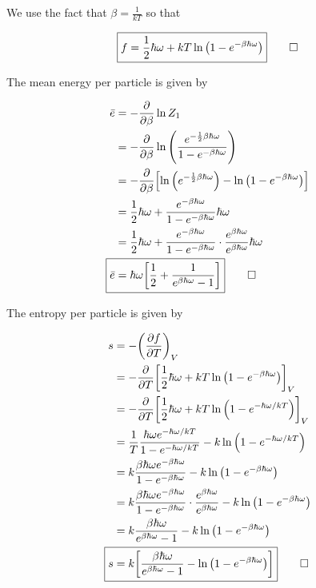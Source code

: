 \documentclass[12pt,a4paper,twocolumn]{article}
\newcommand\ddfrac[2]{\frac{\displaystyle #1}{\displaystyle #2}}
\begin{document}
\begin{enumerate}[(a)]
We use the fact that $\beta = \ddfrac{1}{kT}$ so that

\begin{equation}
	\boxed{
		f = \frac{1}{2}\hbar\omega + kT\ln\qty(1 - e^{-\beta\hbar\omega})
	} \qed \label{eq:answer-f}
\end{equation}

The mean energy per particle is given by

\begin{align}
	\bar{e} &= -\pdv{\beta}\ln{Z_1} \label{eq:mean-energy} \\
	&= -\pdv{\beta}\ln\qty(\frac{e^{-\frac{1}{2}\beta\hbar\omega}}{1 - e^{-\beta\hbar\omega}}) \nonumber \\
	&= -\pdv{\beta}\qty[\ln\qty(e^{-\frac{1}{2}\beta\hbar\omega}) - \ln\qty(1 - e^{-\beta\hbar\omega})] \nonumber \\
	&= \frac{1}{2}\hbar\omega + \frac{e^{-\beta\hbar\omega}}{1 - e^{-\beta\hbar\omega}}\hbar\omega \nonumber \\
	&= \frac{1}{2}\hbar\omega + \frac{e^{-\beta\hbar\omega}}{1 - e^{-\beta\hbar\omega}} \cdot \frac{e^{\beta\hbar\omega}}{e^{\beta\hbar\omega}} \hbar\omega \nonumber \\
	\Aboxed{
		\bar{e} &= \hbar\omega\qty[\frac{1}{2} + \frac{1}{e^{\beta\hbar\omega} - 1}]
	} \qed \label{eq:answer-e}
\end{align}

The entropy per particle is given by

\begin{align}
	s &= -\qty(\pdv{f}{T})_V \label{eq:entropy} \\
	&= -\pdv{T}\qty[\frac{1}{2}\hbar\omega + kT\ln\qty(1 - e^{-\beta\hbar\omega})]_V \nonumber \\
	&= -\pdv{T}\qty[\frac{1}{2}\hbar\omega + kT\ln\qty(1 - e^{-\hbar\omega/kT})]_V \nonumber \\
	&= \frac{1}{T}\frac{\hbar\omega e^{-\hbar\omega/kT}}{1-e^{-\hbar\omega/kT}} - k\ln\qty(1 - e^{-\hbar\omega/kT}) \nonumber \\
	&= k\frac{\beta\hbar\omega e^{-\beta\hbar\omega}}{1-e^{-\beta\hbar\omega}} - k\ln\qty(1 - e^{-\beta\hbar\omega}) \nonumber \\
	&= k\frac{\beta\hbar\omega e^{-\beta\hbar\omega}}{1-e^{-\beta\hbar\omega}} \cdot \frac{e^{\beta\hbar\omega}}{e^{\beta\hbar\omega}} - k\ln\qty(1 - e^{-\beta\hbar\omega}) \nonumber \\
	&= k\frac{\beta\hbar\omega}{e^{\beta\hbar\omega} - 1} - k\ln\qty(1 - e^{-\beta\hbar\omega}) \nonumber \\
	\Aboxed{
		s &= k\qty[\frac{\beta\hbar\omega}{e^{\beta\hbar\omega} - 1} - \ln\qty(1 - e^{-\beta\hbar\omega})]
	} \qed \label{eq:answer-s}
\end{align}


\end{enumerate}
\end{document}
